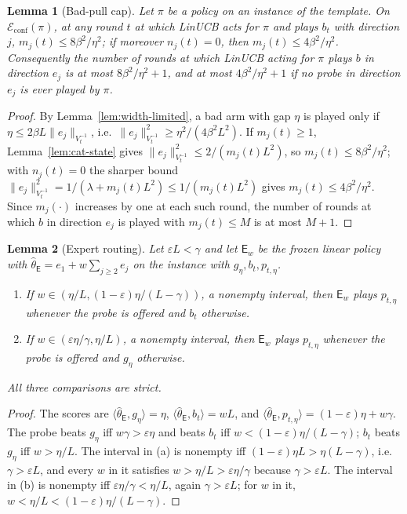 \documentclass{article}
\newtheorem{lemma}{Lemma}
\theoremstyle{definition}
\theoremstyle{remark}
\newcommand{\eps}{\varepsilon}
\theoremstyle{remark}
\newcommand{\Exp}{\mathsf{E}}
\begin{document}
\begin{lemma}[Bad-pull cap]
\label{lem:cat-cap}
Let $\pi$ be a policy on an instance of the template. On
$\mathcal E_{\mathrm{conf}}(\pi)$, at any round $t$ at which LinUCB acts for
$\pi$ and plays $b_t$ with direction $j$, $m_j(t)\le8\beta^2/\eta^2$; if
moreover $n_j(t)=0$, then $m_j(t)\le4\beta^2/\eta^2$. Consequently the number
of rounds at which LinUCB acting for $\pi$ plays $b$ in direction $e_j$ is at
most $8\beta^2/\eta^2+1$, and at most $4\beta^2/\eta^2+1$ if no probe in
direction $e_j$ is ever played by $\pi$.
\end{lemma}

\begin{proof}
By Lemma~\ref{lem:width-limited}, a bad arm with gap $\eta$ is played only if
$\eta\le2\beta L\|e_j\|_{V_t^{-1}}$, i.e.\ $\|e_j\|^2_{V_t^{-1}}\ge\eta^2/(4\beta^2L^2)$.
If $m_j(t)\ge1$, Lemma~\ref{lem:cat-state} gives $\|e_j\|^2_{V_t^{-1}}\le2/(m_j(t)L^2)$,
so $m_j(t)\le8\beta^2/\eta^2$; with $n_j(t)=0$ the sharper bound
$\|e_j\|^2_{V_t^{-1}}=1/(\lambda+m_j(t)L^2)\le1/(m_j(t)L^2)$ gives $m_j(t)\le4\beta^2/\eta^2$.
Since $m_j(\cdot)$ increases by one at each such round, the number of rounds
at which $b$ in direction $e_j$ is played with $m_j(t)\le M$ is at most $M+1$.
\end{proof}

\begin{lemma}[Expert routing]
\label{lem:expert-routes}
Let $\eps L<\gamma$ and let $\Exp_w$ be the frozen linear policy with
$\widehat\theta_{\Exp}=e_1+w\sum_{j\ge2}e_j$ on the instance with $g_\eta,b_t,p_{t,\eta}$.
\begin{enumerate}[itemsep=1pt,topsep=1pt,leftmargin=*]
\item[(a)] If $w\in(\eta/L,(1-\eps)\eta/(L-\gamma))$, a nonempty interval, then
$\Exp_w$ plays $p_{t,\eta}$ whenever the probe is offered and $b_t$ otherwise.
\item[(b)] If $w\in(\eps\eta/\gamma,\eta/L)$, a nonempty interval, then $\Exp_w$ plays
$p_{t,\eta}$ whenever the probe is offered and $g_\eta$ otherwise.
\end{enumerate}
All three comparisons are strict.
\end{lemma}

\begin{proof}
The scores are $\langle\widehat\theta_{\Exp},g_\eta\rangle=\eta$,
$\langle\widehat\theta_{\Exp},b_t\rangle=wL$, and
$\langle\widehat\theta_{\Exp},p_{t,\eta}\rangle=(1-\eps)\eta+w\gamma$. The probe beats
$g_\eta$ iff $w\gamma>\eps\eta$ and beats $b_t$ iff $w<(1-\eps)\eta/(L-\gamma)$; $b_t$
beats $g_\eta$ iff $w>\eta/L$. The interval in (a) is nonempty iff
$(1-\eps)\eta L>\eta(L-\gamma)$, i.e.\ $\gamma>\eps L$, and every $w$ in it satisfies
$w>\eta/L>\eps\eta/\gamma$ because $\gamma>\eps L$. The interval in (b) is nonempty iff
$\eps\eta/\gamma<\eta/L$, again $\gamma>\eps L$; for $w$ in it, $w<\eta/L<(1-\eps)\eta/(L-\gamma)$.
\end{proof}
\end{document}
